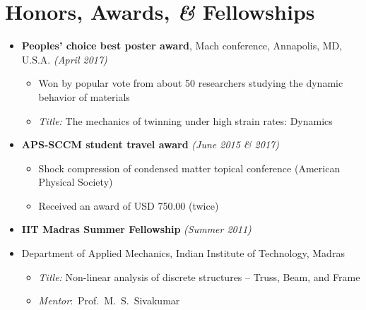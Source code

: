 \documentclass[a4paper,10pt, oneside]{article}
\begin{document}
	\section*{{Honors, Awards, \emph{\&} Fellowships}}
	\begin{itemize}[wide, labelwidth=!, labelindent=-1em]
		\item[]\textbf{Peoples' choice best poster award}, Mach conference, Annapolis, MD, U.S.A. \hfill \textit{(April 2017)}
		\begin{itemize}[wide, labelwidth=!, labelindent=0em]
			\item Won by popular vote from about 50 researchers studying the dynamic behavior of materials
			\item \textit{Title:} The mechanics of twinning under high strain rates: Dynamics
		\end{itemize} 
		\vspace*{0.5em}
		\item[]\textbf{APS-SCCM student travel award} \hfill \textit{(June 2015 {\&} 2017)}
		\begin{itemize}[leftmargin=*]
			\item Shock compression of condensed matter topical conference (American Physical Society)
			\item Received an award of USD 750.00 (twice)
		\end{itemize}
		\vspace*{0.5em}
		\item[]\textbf{IIT Madras Summer Fellowship} \hfill \textit{(Summer 2011)}
		\item[]Department of Applied Mechanics, Indian Institute of Technology, Madras
		\begin{itemize}[wide, labelwidth=!, labelindent=0em]
			\item \textit{Title: }Non-linear analysis of discrete structures -- Truss, Beam, and Frame
			\item \textit{Mentor}:~Prof.~M.~S.~Sivakumar
		\end{itemize}
	\end{itemize}
	
\end{document}
